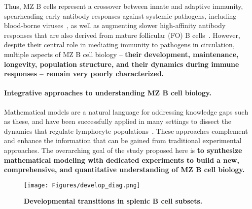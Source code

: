 \documentclass[11pt]{article}
\newcommand{\para}[1]{\vspace*{-4.5mm}\paragraph{#1}}
\newcommand{\red}[1]{{\color{red}{#1}}}
\begin{document}
Thus, MZ B cells represent a crossover between innate and adaptive immunity, spearheading early antibody responses against  systemic pathogens, including blood-borne viruses~\cite{Szomolanyi_Tsuda_1998, Gatto_2004}, as well as augmenting slower high-affinity antibody responses that are also derived from mature follicular (FO) B cells~\cite{Oliver_1999, Attanavanich_2004, Pone_2012}.
However, despite their central role in mediating immunity to pathogens in circulation, multiple aspects of MZ B cell biology -- \textbf{{their development, maintenance, longevity, population structure, and their dynamics during immune responses -- remain very poorly characterized.}}

\para{Integrative approaches to understanding MZ B cell biology.}
Mathematical models are a natural language for addressing knowledge gaps such as these, and have been successfully applied in many settings to dissect the dynamics that regulate lymphocyte populations~\cite{Thomas_Vaslin_1989, Rolink_1999, Antia_2005, Anderson_2009, Dowling_2009, Johnson_2012, Meyer-Hermann_2012,  Gossel_2017, van_Hoeven_2017, Reynaldi_2019,  Verheijen_2020, Asquith_2002, Westera_2013,  De_Boer_2013, DeBoer_2001, Hogan_2015, Rane_2018, Rane_2022, Mold_2019}.
These approaches complement and enhance the information that can be gained from traditional experimental approaches.
The overarching goal of the study proposed here is  \textbf{{to synthesize mathematical modeling with dedicated experiments to build a new,  comprehensive, and quantitative understanding of MZ B cell biology.}}

\begin{wrapfigure}{r}{0.3\textwidth}
\centering
\vspace*{-5mm}
\texttt{[image: Figures/develop\_diag.png]}
\vspace*{-5mm}
\caption{\textbf{Developmental transitions in splenic B cell subsets.}} %
\label{fig:MZ_dev}
\vspace*{-5mm}
\end{wrapfigure}
\end{document}
